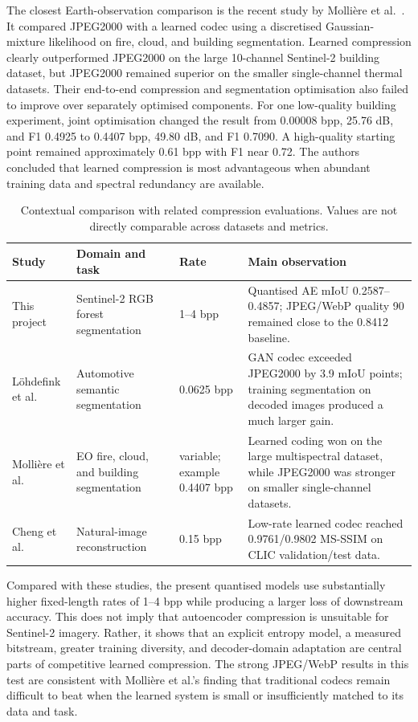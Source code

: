\documentclass[10pt,a4paper]{article}
\begin{document}
The closest Earth-observation comparison is the recent study by Molli\`ere
et al.\ \cite{molliere2025}. It compared JPEG2000 with a learned codec using a
discretised Gaussian-mixture likelihood on fire, cloud, and building
segmentation. Learned compression clearly outperformed JPEG2000 on the large
10-channel Sentinel-2 building dataset, but JPEG2000 remained superior on the
smaller single-channel thermal datasets. Their end-to-end compression and
segmentation optimisation also failed to improve over separately optimised
components. For one low-quality building experiment, joint optimisation
changed the result from 0.00008 bpp, 25.76 dB, and F1 0.4925 to 0.4407 bpp,
49.80 dB, and F1 0.7090. A high-quality starting point remained approximately
0.61 bpp with F1 near 0.72. The authors concluded that learned compression is
most advantageous when abundant training data and spectral redundancy are
available.

\begin{table}[ht]
\centering
\small
\caption{Contextual comparison with related compression evaluations. Values
are not directly comparable across datasets and metrics.}
\begin{tabular}{p{3.0cm}p{2.35cm}p{2.25cm}p{6.2cm}}
\toprule
Study & Domain and task & Rate & Main observation \\
\midrule
This project & Sentinel-2 RGB forest segmentation & 1--4 bpp
& Quantised AE mIoU 0.2587--0.4857; JPEG/WebP quality 90 remained close to
the 0.8412 baseline. \\
L\"ohdefink et al. & Automotive semantic segmentation & 0.0625 bpp
& GAN codec exceeded JPEG2000 by 3.9 mIoU points; training segmentation on
decoded images produced a much larger gain. \\
Molli\`ere et al. & EO fire, cloud, and building segmentation & variable;
example 0.4407 bpp
& Learned coding won on the large multispectral dataset, while JPEG2000 was
stronger on smaller single-channel datasets. \\
Cheng et al. & Natural-image reconstruction & 0.15 bpp
& Low-rate learned codec reached 0.9761/0.9802 MS-SSIM on CLIC
validation/test data. \\
\bottomrule
\end{tabular}
\label{tab:literature}
\end{table}

Compared with these studies, the present quantised models use substantially
higher fixed-length rates of 1--4 bpp while producing a larger loss of
downstream accuracy. This does not imply that autoencoder compression is
unsuitable for Sentinel-2 imagery. Rather, it shows that an explicit entropy
model, a measured bitstream, greater training diversity, and decoder-domain
adaptation are central parts of competitive learned compression. The strong
JPEG/WebP results in this test are consistent with Molli\`ere et al.'s finding
that traditional codecs remain difficult to beat when the learned system is
small or insufficiently matched to its data and task.
\end{document}
